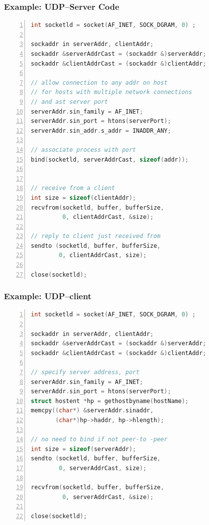 \documentclass[12pt]{beamer}
\begin{document}
\begin{frame}[fragile]
	\frametitle{Example: UDP--Server Code}	
	{\tiny
	\begin{lstlisting}[language=C, breaklines=true, commentstyle=\color{mygreen},frame=lrtb,  rulecolor=\color{black}, numbers=left,  numbersep=5pt, numberstyle=\tiny\color{mygray}]
int socketld = socket(AF_INET, SOCK_DGRAM, 0) ;

sockaddr in serverAddr, clientAddr;
sockaddr &serverAddrCast = (sockaddr &)serverAddr;
sockaddr &clientAddrCast = (sockaddr &)clientAddr;

// allow connection to any addr on host
// for hosts with multiple network connections
// and ast server port
serverAddr.sin_family = AF_INET;
serverAddr.sin_port = htons(serverPort);
serverAddr.sin_addr.s_addr = INADDR_ANY;

// associate process with port
bind(socketld, serverAddrCast, sizeof(addr));


// receive from a client
int size = sizeof(clientAddr);
recvfrom(socketld, buffer, bufferSize,
         0, clientAddrCast, &size);
         
// reply to client just received from 
sendto (socketld, buffer, bufferSize,
        0, clientAddrCast, size);
        	
close(socketld);
	\end{lstlisting}}
\end{frame}	
\begin{frame}[fragile]
	\frametitle{Example: UDP--client}	
	{\tiny
	\begin{lstlisting}[language=C, breaklines=true, commentstyle=\color{mygreen},frame=lrtb,  rulecolor=\color{black}, numbers=left,  numbersep=5pt, numberstyle=\tiny\color{mygray}]
	int socketld = socket(AF_INET, SOCK_DGRAM, 0) ;

sockaddr in serverAddr, clientAddr;
sockaddr &serverAddrCast = (sockaddr &)serverAddr;
sockaddr &clientAddrCast = (sockaddr &)clientAddr;

// specify server address, port
serverAddr.sin_family = AF_INET;
serverAddr.sin_port = htons(serverPort);
struct hostent *hp = gethostbyname(hostName);
memcpy((char*) &serverAddr.sinaddr,
       (char*)hp->haddr, hp->hlength);
  
// no need to bind if not peer-to -peer
int size = sizeof(serverAddr);	
sendto (socketld, buffer, bufferSize,
        0, serverAddrCast, size);

recvfrom(socketld, buffer, bufferSize,
         0, serverAddrCast, &size);
         	
close(socketld);
	\end{lstlisting}
	}
\end{frame}
\end{document}
